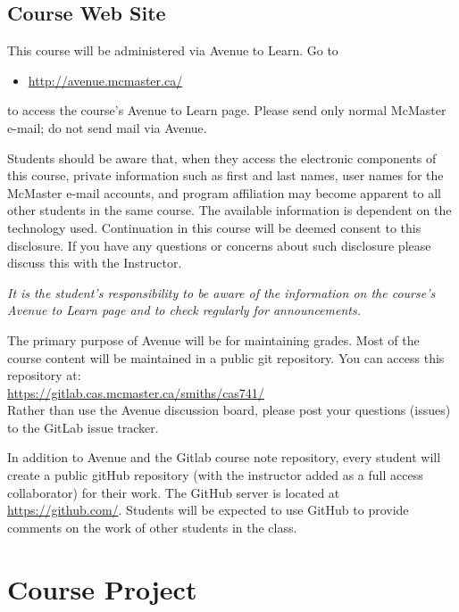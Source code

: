 \documentclass[12pt]{article}
\newcommand{\bi}{\begin{itemize}}
\newcommand{\ei}{\end{itemize}}
\begin{document}
\subsection*{Course Web Site}

This course will be administered via Avenue to Learn.  Go to

\bi

  \item[] \url{http://avenue.mcmaster.ca/} 

\ei

\noindent to access the course's Avenue to Learn page.  Please send only normal 
McMaster e-mail; do not send mail via Avenue.

Students should be aware that, when they access the electronic
components of this course, private information such as first and last
names, user names for the McMaster e-mail accounts, and program
affiliation may become apparent to all other students in the same
course.  The available information is dependent on the technology
used.  Continuation in this course will be deemed consent to this
disclosure.  If you have any questions or concerns about such
disclosure please discuss this with the Instructor.

\emph{It is the student's responsibility to be aware of the
  information on the course's Avenue to Learn page and to check
  regularly for announcements.}
  
The primary purpose of Avenue will be for maintaining grades.  Most
of the course content will be maintained in a public git repository.
You can access this repository at:\\

\href{https://gitlab.cas.mcmaster.ca/smiths/cas741/}{https://gitlab.cas.mcmaster.ca/smiths/cas741/}\\

\noindent Rather than use the Avenue discussion board, please post your
questions (issues) to the GitLab issue tracker.

In addition to Avenue and the Gitlab course note repository, every student will
create a public gitHub repository (with the instructor added as a full access
collaborator) for their work.  The GitHub server is located at
\url{https://github.com/}.  Students will be expected to use GitHub to provide
comments on the work of other students in the class.

\section {Course Project}
\end{document}
